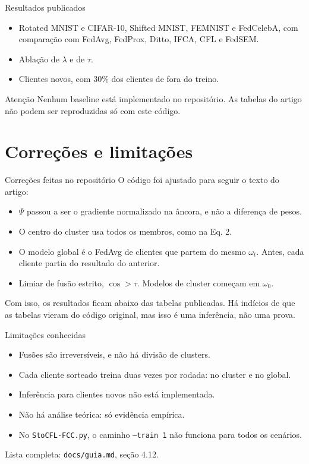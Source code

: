 \documentclass[aspectratio=169]{beamer}
\begin{document}
\begin{frame}{Resultados publicados}
  \begin{itemize}
    \item Rotated MNIST e CIFAR-10, Shifted MNIST, FEMNIST e FedCelebA, com comparação com FedAvg,
      FedProx, Ditto, IFCA, CFL e FedSEM.
    \item Ablação de $\lambda$ e de $\tau$.
    \item Clientes novos, com 30\% dos clientes de fora do treino.
  \end{itemize}
  \vspace{0.6em}
  \begin{alertblock}{Atenção}
    Nenhum baseline está implementado no repositório. As tabelas do artigo não podem ser
    reproduzidas só com este código.
  \end{alertblock}
\end{frame}

\section{Correções e limitações}

\begin{frame}{Correções feitas no repositório}
  O código foi ajustado para seguir o texto do artigo:
  \begin{itemize}
    \item $\Psi$ passou a ser o gradiente normalizado na âncora, e não a diferença de pesos.
    \item O centro do cluster usa todos os membros, como na Eq. 2.
    \item O modelo global é o FedAvg de clientes que partem do mesmo $\omega_t$.
      Antes, cada cliente partia do resultado do anterior.
    \item Limiar de fusão estrito, $\cos > \tau$. Modelos de cluster começam em $\omega_0$.
  \end{itemize}
  \vspace{0.4em}
  \alert{Com isso, os resultados ficam abaixo das tabelas publicadas.} Há indícios de que as
  tabelas vieram do código original, mas isso é uma inferência, não uma prova.
\end{frame}

\begin{frame}{Limitações conhecidas}
  \begin{itemize}
    \item Fusões são irreversíveis, e não há divisão de clusters.
    \item Cada cliente sorteado treina duas vezes por rodada: no cluster e no global.
    \item Inferência para clientes novos não está implementada.
    \item Não há análise teórica: só evidência empírica.
    \item No \texttt{StoCFL-FCC.py}, o caminho \texttt{--train 1} não funciona para todos os cenários.
  \end{itemize}
  \vspace{0.4em}
  \small Lista completa: \texttt{docs/guia.md}, seção 4.12.
\end{frame}
\end{document}
